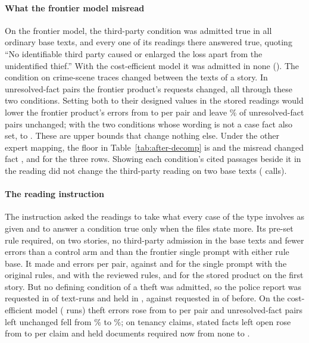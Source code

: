 \paragraph{What the frontier model misread}
On the frontier model, the third-party condition was admitted true in all \fuGTerraOffTexts{} ordinary base texts, and every one of its \fuGTerraSingleOff{} readings there answered true, quoting ``No identifiable third party caused or enlarged the loss apart from the unidentified thief.'' With the cost-efficient model it was admitted in none (\fuGLunaOffAdmitted). The condition on crime-scene traces changed between the texts of a story. In \fuTerraUnresChanged{} unresolved-fact pairs the frontier product's requests changed, all through these two conditions. Setting both to their designed values in the stored readings would lower the frontier product's errors from \fuDecTerraTotal{} to \fuTerraFixTwo{} per pair and leave \fuTerraFixTwoUnres\% of unresolved-fact pairs unchanged; with the two conditions whose wording is not a case fact also set, to \fuTerraFixFour. These are upper bounds that change nothing else. Under the other expert mapping, the floor in Table~\ref{tab:after-decomp} is \fuDecTerraFloorAlt{} and the misread changed fact \fuDecLunaChangedAlt, \fuDecLunaChkChangedAlt{} and \fuDecTerraChangedAlt{} for the three rows. Showing each condition's cited passages beside it in the reading did not change the third-party reading on two base texts (\fuPassagesCalls{} calls).

\paragraph{The reading instruction}
The instruction asked the readings to take what every case of the type involves as given and to answer a condition true only when the files state more. Its pre-set rule required, on two stories, no third-party admission in the base texts and fewer errors than a control arm and than the frontier single prompt with either rule base. It made \fuCaseTypeStoryEight{} and \fuCaseTypeStoryNine{} errors per pair, against \fuCaseTypeOrigEight{} and \fuCaseTypeOrigNine{} for the single prompt with the original rules, \fuCaseTypeRevEight{} and \fuCaseTypeRevNine{} with the reviewed rules, and \fuCaseTypeStoredEight{} for the stored product on the first story. But no defining condition of a theft was admitted, so the police report was requested in \fuCaseTypePoliceRequested{} of \fuCaseTypeTextRuns{} text-runs and held in \fuCaseTypePoliceHeld{}, against requested in \fuCaseTypeStoredPoliceRequested{} of \fuCaseTypeStoredTextRuns{} before. On the cost-efficient model (\fuCaseTypeLunaRuns{} runs) theft errors rose from \fuCaseTypeLunaOff{} to \fuCaseTypeLunaOn{} per pair and unresolved-fact pairs left unchanged fell from \fuCaseTypeLunaUnresOff\% to \fuCaseTypeLunaUnresOn\%; on \fuCaseTypeTenClaims{} tenancy claims, stated facts left open rose from \fuCaseTypeTenOpenOff{} to \fuCaseTypeTenOpenOn{} per claim and held documents required now from none to \fuCaseTypeTenHeldReqOn.

